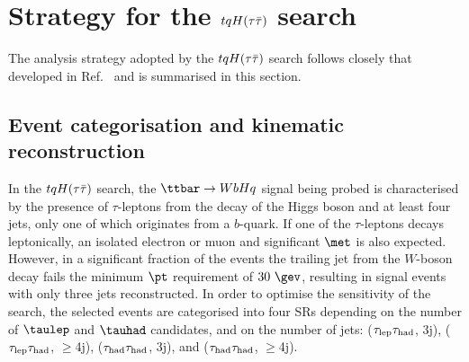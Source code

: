 \section{Strategy for the $tqH(\tau\bar{\tau})$ search}
\label{sec:strategy_Htautau}

The analysis strategy adopted by the $tqH(\tau\bar{\tau})$ search follows closely that developed in Ref.~\cite{Chen:2015nta} and is summarised in this section.

\subsection{Event categorisation and kinematic reconstruction}
\label{sec:htautau_reco_cat}

In the $tqH(\tau\bar{\tau})$ search, the $\ttbar \to WbHq$ signal being probed is characterised by the presence of $\tau$-leptons from the decay of 
the Higgs boson and at least four jets, only one of which originates from a $b$-quark.
If one of the $\tau$-leptons decays leptonically, an isolated electron or muon and significant $\met$ is also expected.
However, in a significant fraction of the events the trailing jet from the $W$-boson decay fails the minimum $\pt$ requirement of $30~\gev$,
resulting in signal events with only three jets reconstructed.
In order to optimise the sensitivity of the search, the selected events are categorised into four SRs depending 
on the number of $\taulep$ and $\tauhad$ candidates, and on the number of jets:
($\tau_{\mathrm{lep}} \tau_{\mathrm{had}}$, 3j), ($\tau_{\mathrm{lep}} \tau_{\mathrm{had}}$, $\geq$4j), ($\tau_{\mathrm{had}} \tau_{\mathrm{had}}$, 3j), and ($\tau_{\mathrm{had}} \tau_{\mathrm{had}}$, $\geq$4j). 

